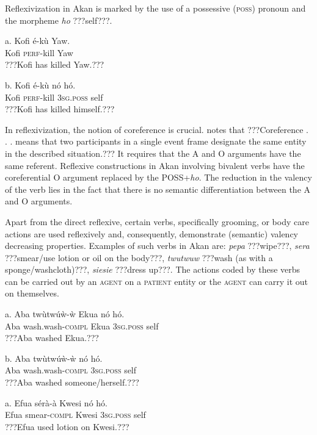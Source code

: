 \documentclass[output=paper]{langsci/langscibook}
\begin{document}
Reflexivization in Akan is marked by the use of a possessive (\textsc{poss}) pronoun and the morpheme \emph{ho} ???self???.


\ea
\gll a.  Kofi  é-k\`{u}    Yaw.\\
       Kofi  \textsc{perf}{}-kill  Yaw\\
\glt ???Kofi has killed Yaw.???
\z

\ea
\gll  b.  Kofi    é-k\`{u}    nó    hó.\\
       Kofi    \textsc{perf}{}-kill  \textsc{3sg.poss}  self\\
\glt ???Kofi has killed himself.???
\z

In reflexivization, the notion of coreference is crucial. \citet[44]{Kemmer1993} notes that ???Coreference . . .  means that two participants in a single event frame designate the same entity in the described situation.???  It requires that the A and O arguments have the same referent. Reflexive constructions in Akan involving bivalent verbs have the coreferential O argument replaced by the POSS+\emph{ho}.  The reduction in the valency of the verb lies in the fact that there is no semantic differentiation between the A and O arguments. 

Apart from the direct reflexive, certain verbs, specifically grooming, or body care actions \citep{Kemmer1993} are used reflexively and, consequently, demonstrate (semantic) valency decreasing properties. Examples of such verbs in Akan are: \emph{pepa} ???wipe???, \emph{sera} ???smear/use lotion or oil on the body???, \emph{twutwuw} ???wash (as with a sponge/washcloth)???, \emph{siesie} ???dress up???. The actions coded by these verbs can be carried out by an \textsc{agent} on a \textsc{patient} entity or the \textsc{agent} can carry it out on themselves. 

\ea
\gll a.  Aba  tw\`{u}twúẁ-ẁ    Ekua  nó    hó.\\
       Aba  wash.wash-\textsc{compl}  Ekua  \textsc{3sg.poss}  self\\
\glt   ???Aba washed Ekua.???
\z

\ea
\gll  b.  Aba  tw\`{u}twúẁ-ẁ    nó    hó.\\
       Aba  wash.wash-\textsc{compl}  \textsc{3sg.poss}  self\\
\glt   ???Aba washed someone/herself.???
\z

\ea
\gll a.  Efua  sérà-à    Kwesi    nó    hó.\\
       Efua  smear-\textsc{compl}  Kwesi    \textsc{3sg.poss}  self\\
\glt   ???Efua used lotion on Kwesi.???
\z
\end{document}
